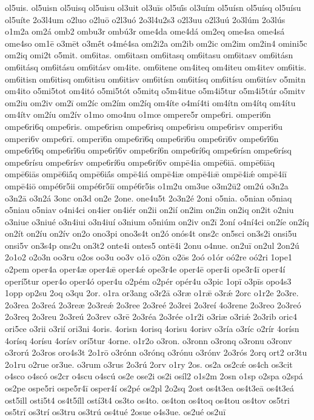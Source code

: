 {ol5uis.
ol5uisn
ol5uisq
ol5uisu
ol3uit
ol3uīs
ol5uī́s
ol3uím
ol5uísn
ol5uísq
ol5uísu
ol5uíte
2o3l4um
o2luo
o2luō
o2l3uó
2o3l4u2s3
o2l3uu
o2l3uú
2o3lúm
2o3lús
o1m2a
om2á
omb2
ombu3r
ombú3r
ome4da
ome4dá
om2eq
ome4sa
ome4sá
ome4so
om1ē
o3mēt
o3mḗt
o4mé4sa
om2i2a
om2ib
om2ic
om2im
om2in4
omini5c
om2iq
omi2t
o5mit.
om6itas.
om6itasn
om6itasq
om6itasu
om6itasv
om6itásn
om6itásq
om6itásu
om6itásv
om4ite.
om6itene
om4iteq
om4iteu
om4itev
om6itis.
om6itisn
om6itisq
om6itisu
om6itisv
om6itísn
om6itísq
om6itísu
om6itísv
o5mitn
om4ito
o5mi5tot
om4itó
o5mi5tót
o5mitq
o5m4itue
o5m4i5tur
o5m4i5túr
o5mitv
om2iu
om2iv
om2ī
om2íc
om2ím
om2íq
om4íte
o4mí4ti
om4ítn
om4ítq
om4ítu
om4ítv
om2íu
om2ív
o1mo
omo4nu
o1mœ
ompere5r
ompe6ri.
omperi6n
ompe6ri6q
ompe6ris.
ompe6risn
ompe6risq
ompe6risu
ompe6risv
omperi6u
omperi6v
ompe6rī.
omperī6n
ompe6rī6q
ompe6rī6u
ompe6rī6v
ompe6rī́6n
ompe6rī́6q
ompe6rī́6u
ompe6rī́6v
ompe6rí6n
ompe6rí6q
ompe6rísn
ompe6rísq
ompe6rísu
ompe6rísv
ompe6rí6u
ompe6rí6v
ompē4ia
ompē6iā.
ompē6iāq
ompē6iās
ompē6iā́q
ompē6iā́s
ompē4iá
ompē4iæ
ompē4iǣ
ompē4iǽ
ompē4iī
ompē4iō
ompé6r5ii
ompé6r5iī
ompé6r5is
o1m2u
om3ue
o3m2ū2
om2ú
o3n2a
o3n2ā
o3n2á
3onc
on3d
on2e
2one.
one4u5t
2o3n2é
2oni
o5nia.
o5nian
o5niaq
o5niau
o5niav
o4ni4ci
on4ier
on4iér
on2ii
on2ií
on2im
on2in
on2iq
on2it
o2niu
o3niue
o3niué
o3n4iui
o3n4iuí
o3nium
o5niúm
on2iv
on2ī
2oní
o4ní4ci
on2íe
on2íq
on2ít
on2íu
on2ív
on2o
ono3pi
ono3s4t
on2ó
onós4t
ons2c
on5sci
on3s2i
onsi5u
onsi5v
on3s4p
ons2u
on3t2
onte4i
ontes5
ontē4i
2onu
o4nue.
on2uī
on2ul
2on2ú
2o1o2
o2o3n
oo3ru
o2os
oo3u
oo3v
o1ō
o2ōn
o2ōs
2oó
o1ór
oó2re
oó2ri
1ope1
o2pem
oper4a
oper4æ
oper4ǣ
oper4ǽ
ope3r4e
oper4ē
oper4i
ope3r4ī
oper4í
operí5tur
oper4o
oper4ó
oper4u
o2pém
o2pér
opér4u
o3pic
1opī
o3pīs
opo4s3
1opp
op2su
2oq
o3qu
2or.
o1ra
or3ang
o3r2ā
o3ræ
o1rǣ
o3rǽ
2orc
o1r2e
2o3re.
2o3rea
2o3reá
2o3reæ
2o3reǽ
2o3ree
2o3reé
2o3rei
2o3reí
4o3rene
2o3reo
2o3reó
2o3req
2o3reu
2o3reú
2o3rev
o3rē
2o3réa
2o3rée
o1r2i
o3riæ
o3riǽ
2o3rib
oric4
ori5ce
o3rii
o3rií
ori3ni
4oris.
4orisn
4orisq
4orisu
4orisv
o3ría
o3ríc
o2rír
4orísn
4orísq
4orísu
4orísv
orí5tur
4orne.
o1r2o
o3ron.
o3ronn
o3ronq
o3ronu
o3ronv
o3rorú
2o3ros
oro4s3t
2o1rō
o3rónn
o3rónq
o3rónu
o3rónv
2o3rós
2orq
ort2
or3tu
2o1ru
o2rue
or3ue.
o3rum
o3rus
2o3rú
2orv
o1ry
2os.
os2a
os2cǽ
os4ch
os3cit
o4sco
o4scó
os2cr
o4scu
o4scú
os2e
ose2i
os2i
osíl2
o1s2m
2osn
o1sp
o2spa
o2spá
os2pe
ospe5ri
ospe5r4ī
osper4í
os2pé
os2pl
2o2sq
2ost
os4t3ea
os4t3eā
os4t3eá
ost5ill
osti5t4
os4t5íll
ostí3t4
os3to
os4to.
os4ton
os4toq
os4tou
os4tov
os5tri
os5trī
os3trí
os3tru
os3trú
os4tué
2osue
o4s3ue.
os2ué
os2uī
}
